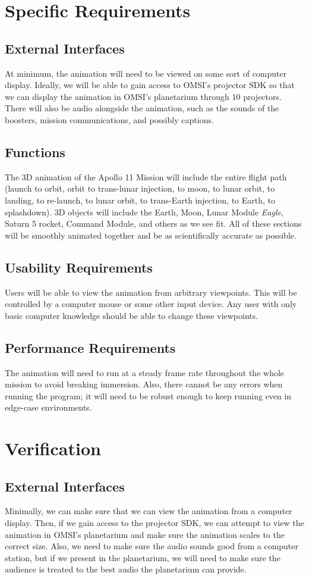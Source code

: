 \documentclass[onecolumn, draftclsnofoot,10pt, compsoc]{IEEEtran}
\begin{document}
\section{Specific Requirements}
    \subsection{External Interfaces}
    At minimum, the animation will need to be viewed on some sort of computer display. Ideally, we will be able to gain access to OMSI's projector SDK so that we can display the animation in OMSI's planetarium through 10 projectors. There will also be audio alongside the animation, such as the sounds of the boosters, mission communications, and possibly captions.
    \subsection{Functions}
    The 3D animation of the Apollo 11 Mission will include the entire flight path (launch to orbit, orbit to trans-lunar injection, to moon, to lunar orbit, to landing, to re-launch, to lunar orbit, to trans-Earth injection, to Earth, to splashdown). 3D objects will include the Earth, Moon, Lunar Module \textit{Eagle}, Saturn 5 rocket, Command Module, and others as we see fit. All of these sections will be smoothly animated together and be as scientifically accurate as possible.
    \subsection{Usability Requirements}
    Users will be able to view the animation from arbitrary viewpoints. This will be controlled by a computer mouse or some other input device. Any user with only basic computer knowledge should be able to change these viewpoints.
    \subsection{Performance Requirements}
    The animation will need to run at a steady frame rate throughout the whole mission to avoid breaking immersion. Also, there cannot be any errors when running the program; it will need to be robust enough to keep running even in edge-case environments.
\section{Verification}
    \subsection{External Interfaces}
    Minimally, we can make sure that we can view the animation from a computer display. Then, if we gain access to the projector SDK, we can attempt to view the animation in OMSI's planetarium and make sure the animation scales to the correct size. Also, we need to make sure the audio sounds good from a computer station, but if we present in the planetarium, we will need to make sure the audience is treated to the best audio the planetarium can provide. 
\end{document}
